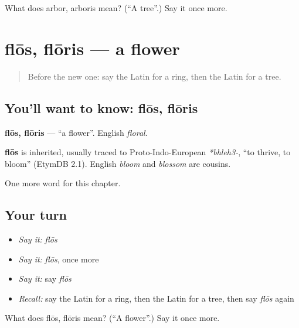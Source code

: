 \begin{tcolorbox}[breakable,colback=teal!4,colframe=teal!35!black,title={Before you move on}]
What does arbor, arboris mean? (\textquotedblleft{}A tree\textquotedblright{}.) Say it once more.
\end{tcolorbox}
\section[flōs, flōris]{flōs, flōris — a flower}

\label{lesson:LA-C86-flos}



\begin{quote}
Before the new one: say the Latin for a ring, then the Latin for a tree.
\end{quote}

\subsection*{You'll want to know: flōs, flōris}
\textbf{flōs, flōris} — \textquotedblleft{}a flower\textquotedblright{}. English \emph{floral}.

\begin{cousinweb}
\textbf{flōs} is inherited, usually traced to Proto-Indo-European \emph{*bhleh3-}, \textquotedblleft{}to thrive, to bloom\textquotedblright{} (EtymDB 2.1). English \emph{bloom} and \emph{blossom} are cousins.
\end{cousinweb}

\begin{grammarlens}[title={What you've built}]
One more word for this chapter.
\end{grammarlens}

\subsection*{Your turn}
\begin{itemize}
\raggedright
  \item \emph{Say it:} \emph{flōs}
  \item \emph{Say it:} \emph{flōs}, once more
  \item \emph{Say it:} say \emph{flōs}
  \item \emph{Recall:} say the Latin for a ring, then the Latin for a tree, then say \emph{flōs} again
\end{itemize}

\begin{tcolorbox}[breakable,colback=teal!4,colframe=teal!35!black,title={Before you move on}]
What does flōs, flōris mean? (\textquotedblleft{}A flower\textquotedblright{}.) Say it once more.
\end{tcolorbox}

